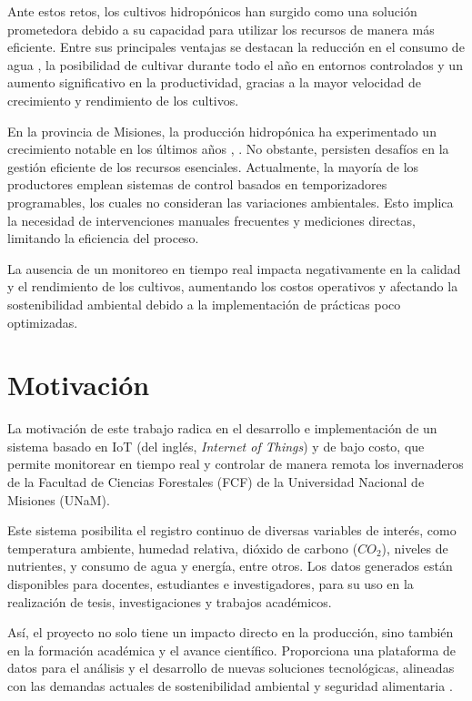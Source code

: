 Ante estos retos, los cultivos hidropónicos han surgido como una solución
prometedora debido a su capacidad para utilizar los recursos de manera más
eficiente. Entre sus principales ventajas se destacan la reducción en el
consumo de agua \cite{EficienciaAgua2014}, la posibilidad de cultivar durante
todo el año en entornos controlados y un aumento significativo en la
productividad, gracias a la mayor velocidad de crecimiento y rendimiento de los
cultivos.

En la provincia de Misiones, la producción hidropónica ha experimentado un
crecimiento notable en los últimos años \cite{HorticulturaMisiones2024},
\cite{HidroponiaMisiones2024}. No obstante, persisten desafíos en la gestión
eficiente de los recursos esenciales. Actualmente, la mayoría de los
productores emplean sistemas de control basados en temporizadores programables,
los cuales no consideran las variaciones ambientales. Esto implica la necesidad
de intervenciones manuales frecuentes y mediciones directas, limitando la
eficiencia del proceso.

La ausencia de un monitoreo en tiempo real impacta negativamente en la calidad
y el rendimiento de los cultivos, aumentando los costos operativos y afectando
la sostenibilidad ambiental debido a la implementación de prácticas poco
optimizadas.


\section{Motivación}

La motivación de este trabajo radica en el desarrollo e implementación de un
sistema basado en IoT (del inglés, \textit{Internet of Things}) y de bajo costo, que
permite monitorear en tiempo real y controlar de manera remota los invernaderos
de la Facultad de Ciencias Forestales (FCF) de la Universidad Nacional de
Misiones (UNaM).

Este sistema posibilita el registro continuo de diversas variables de interés,
como temperatura ambiente, humedad relativa, dióxido de carbono ($CO_2$),
niveles de nutrientes, y consumo de agua y energía, entre otros. Los datos
generados están disponibles para docentes, estudiantes e investigadores, para
su uso en la realización de tesis, investigaciones y trabajos académicos.

Así, el proyecto no solo tiene un impacto directo en la producción, sino
también en la formación académica y el avance científico. Proporciona una
plataforma de datos para el análisis y el desarrollo de nuevas soluciones
tecnológicas, alineadas con las demandas actuales de sostenibilidad ambiental y
seguridad alimentaria \cite{seguridadAlimentariaGaribaldi2018}.

